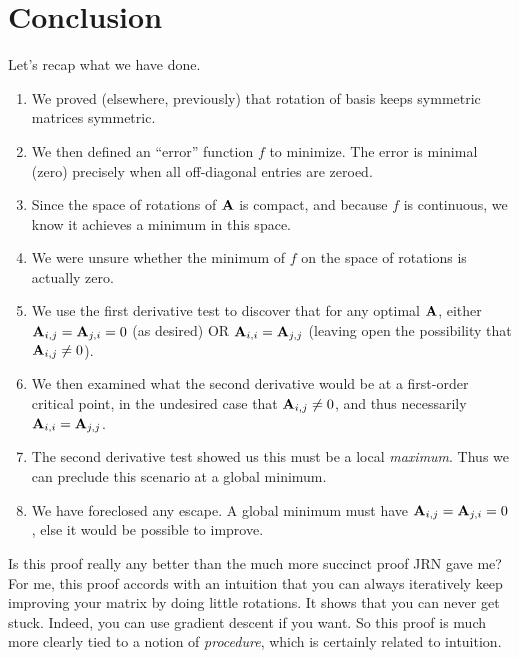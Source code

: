 \section{Conclusion}

Let's recap what we have done.

\begin{enumerate}
  \item We proved (elsewhere, previously) that rotation of basis keeps
  symmetric matrices symmetric.

  \item We then defined an ``error'' function $f$ to minimize. The error
  is minimal (zero) precisely when all off-diagonal entries are zeroed.

  \item Since the space of rotations of $\mathbf{A}$ is compact, and because
  $f$ is continuous, we know it achieves a minimum in this space.

  \item We were unsure whether the minimum of $f$ on the space of
  rotations is actually zero.

  \item We use the first derivative test to discover that for any
  optimal $\mathbf{A}$, either $\mathbf{A}_{i, j} = \mathbf{A}_{j, i} = 0$ (as desired)
  OR $\mathbf{A}_{i, i} = \mathbf{A}_{j, j}$ (leaving open the possibility that
  $\mathbf{A}_{i, j} \ne 0$).

  \item We then examined what the second derivative would be at a
  first-order critical point, in the undesired case that $\mathbf{A}_{i, j}
  \ne 0$, and thus necessarily $\mathbf{A}_{i, i} = \mathbf{A}_{j, j}$.

  \item The second derivative test showed us this must be a local
  \emph{maximum}. Thus we can preclude this scenario at a global
  minimum.

  \item We have foreclosed any escape. A global minimum must have
  $\mathbf{A}_{i, j} = \mathbf{A}_{j, i} = 0$, else it would be possible to
  improve.
\end{enumerate}

Is this proof really any better than the much more succinct proof JRN
gave me? For me, this proof accords with an intuition that you can
always iteratively keep improving your matrix by doing little rotations.
It shows that you can never get stuck. Indeed, you can use gradient
descent if you want. So this proof is much more clearly tied to a notion
of \textit{procedure}, which is certainly related to intuition.

